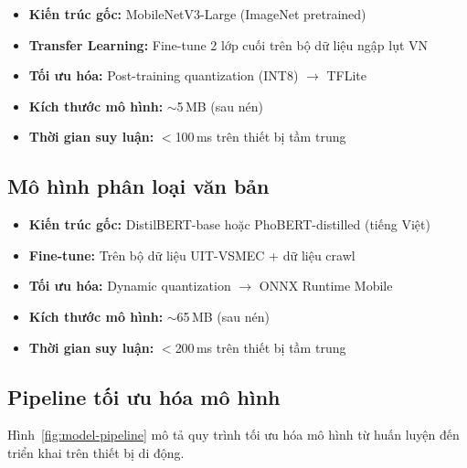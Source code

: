 \documentclass[12pt, a4paper]{report}
\begin{document}
\begin{itemize}
  \item \textbf{Kiến trúc gốc:} MobileNetV3-Large (ImageNet pretrained)
  \item \textbf{Transfer Learning:} Fine-tune 2 lớp cuối trên bộ dữ liệu ngập lụt VN
  \item \textbf{Tối ưu hóa:} Post-training quantization (INT8) $\rightarrow$ TFLite
  \item \textbf{Kích thước mô hình:} $\sim$5\,MB (sau nén)
  \item \textbf{Thời gian suy luận:} $<$100\,ms trên thiết bị tầm trung
\end{itemize}

\subsection{Mô hình phân loại văn bản}

\begin{itemize}
  \item \textbf{Kiến trúc gốc:} DistilBERT-base hoặc PhoBERT-distilled (tiếng Việt)
  \item \textbf{Fine-tune:} Trên bộ dữ liệu UIT-VSMEC + dữ liệu crawl
  \item \textbf{Tối ưu hóa:} Dynamic quantization $\rightarrow$ ONNX Runtime Mobile
  \item \textbf{Kích thước mô hình:} $\sim$65\,MB (sau nén)
  \item \textbf{Thời gian suy luận:} $<$200\,ms trên thiết bị tầm trung
\end{itemize}

\subsection{Pipeline tối ưu hóa mô hình}

Hình~\ref{fig:model-pipeline} mô tả quy trình tối ưu hóa mô hình từ huấn luyện đến triển khai trên thiết bị di động.
\end{document}
